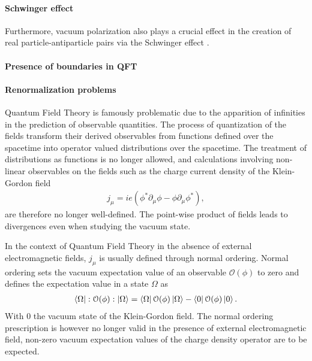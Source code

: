 \paragraph{Schwinger effect}
Furthermore, vacuum polarization also plays a crucial effect in the creation of real particle-antiparticle pairs via the Schwinger effect \cite{Schw51}. 

\paragraph{Presence of boundaries in QFT}

\paragraph{Renormalization problems}
Quantum Field Theory is famously problematic due to the apparition of infinities in the prediction of observable quantities. The process of quantization of the fields transform their derived observables from functions defined over the spacetime into operator valued distributions over the spacetime. The treatment of distributions as functions is no longer allowed, and calculations involving non-linear observables on the fields such as the charge current density of the Klein-Gordon field
\begin{align}
    j_\mu = ie (\phi^* \partial_\mu \phi - \phi \partial_\mu \phi^*),
\end{align}
are therefore no longer well-defined. The point-wise product of fields leads to divergences even when studying the vacuum state.

In the context of Quantum Field Theory in the absence of external electromagnetic fields, $j_\mu$ is usually defined through normal ordering. Normal ordering sets the vacuum expectation value of an observable $\mathcal{O}(\phi)$ to zero and defines the expectation value in a state $\Omega$ as 
\begin{align}
    \bra{\Omega} :\mathcal{O} (\phi):\ket{\Omega} = 
    \bra{\Omega} \mathcal{O} (\phi)\ket{\Omega} -
    \bra{0} \mathcal{O} (\phi)\ket{0} .
\end{align}
With $0$ the vacuum state of the Klein-Gordon field.
The normal ordering prescription is however no longer valid in the presence of external electromagnetic field, non-zero vacuum expectation values of the charge density operator are to be expected. 

